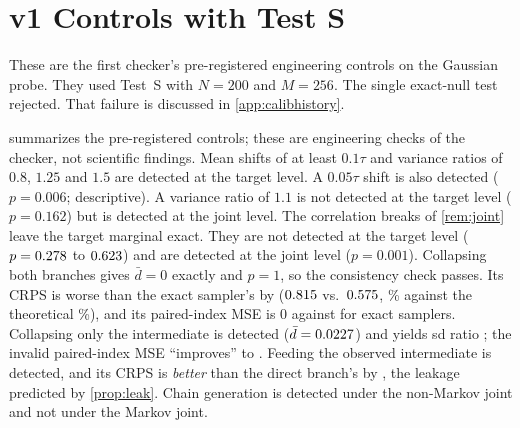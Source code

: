 \documentclass{article}
\theoremstyle{plain}
\theoremstyle{definition}
\theoremstyle{remark}
\begin{document}
\section{v1 Controls with Test S}
\label{app:controls}\label{sec:exp-controls}
These are the first checker's pre-registered engineering controls on the Gaussian probe. They used Test~S with $N=200$ and $M=256$. The single exact-null test rejected. That failure is discussed in \cref{app:calibhistory}.
\begin{table}[h]
\centering
\caption{Controls on the non-Markov probe (last row: Markov), Test~S, $N=200$ examples, $M=256$. $\bar d$ and $\bar d_J$ are the mean target- and joint-level contrasts $\times10^3$. $\Delta$CRPS is the mean paired difference in CRPS between the compared and the reference branch $\times10^3$; $^\dagger$ marks the difference against the exact direct sampler, re-aggregated from raw. The sd ratio is the oracle sample sd over the true conditional sd. Every pre-registered detect / no-detect expectation in this table was met except for the exact null in the first row. The exact null on the Markov joint (not shown, $p=\numMarkovNullP$) also rejected; it reused the same noise (\cref{sec:calib}). Rows for $0.05\tau$ and variance ratio $1.1$ were pre-registered as descriptive.}
\label{tab:controls}
\scriptsize

\end{table}


 summarizes the pre-registered controls; these are engineering checks of the checker, not scientific findings.
Mean shifts of at least $0.1\tau$ and variance ratios of $0.8$, $1.25$ and $1.5$ are detected at the target level. A $0.05\tau$ shift is also detected ($p=0.006$; descriptive).
A variance ratio of $1.1$ is not detected at the target level ($p=0.162$) but is detected at the joint level.
The correlation breaks of \cref{rem:joint} leave the target marginal exact. They are not detected at the target level ($p=0.278$ to $0.623$) and are detected at the joint level ($p=0.001$).
Collapsing both branches gives $\bar d=0$ exactly and $p=1$, so the consistency check passes. Its CRPS is worse than the exact sampler's by \numCollapseVsExactCRPS{} ($0.815$ vs.\ $0.575$, \numCRPScollapsePct\% against the theoretical \numCRPScollapseTheoryPct\%), and its paired-index MSE is $0$ against \numExactMSE{} for exact samplers.
Collapsing only the intermediate is detected ($\bar d=0.0227$) and yields sd ratio \numCollIntDiv; the invalid paired-index MSE ``improves'' to \numCollIntMSE.
Feeding the observed intermediate is detected, and its CRPS is \emph{better} than the direct branch's by \numObsIntCRPS, the leakage predicted by \cref{prop:leak}.
Chain generation is detected under the non-Markov joint and not under the Markov joint.
\end{document}
